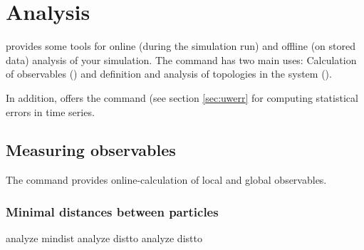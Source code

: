 %  
%   
%  
%  
%
\newcommand{\taumax}{\tau_{\mathrm{max}}}
\newcommand{\taumin}{\tau_{\mathrm{min}}}
\chapter{Analysis}
\label{chap:analysis}

\es provides some tools for online (during the simulation run) and
offline (on stored data) analysis of your simulation. The
 command has two main uses: Calculation of
observables () and definition and
analysis of topologies in the system ().

In addition, \es offers the command  (see section
\ref{sec:uwerr} for computing statistical errors in time series.

\section{Measuring observables}

The command  provides online-calculation of local and
global observables. 

\subsection{Minimal distances between particles}
\label{analyze:mindist}
\label{analyze:distto}

\begin{essyntax}
   analyze mindist 
   analyze distto 
   analyze distto   
\end{essyntax}

